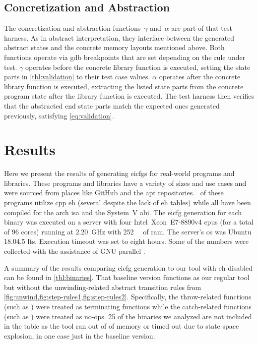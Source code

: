 \subsection{Concretization and Abstraction}
The concretization and abstraction functions~$\gamma$ and~$\alpha$ are part of that test harness.
As in abstract interpretation, they interface between the generated abstract states and the concrete memory layouts mentioned above.
Both functions operate via \gls{gdb} breakpoints that are set depending on the rule under test.
$\gamma$ operates before the concrete library function is executed, setting the state parts in \cref{tbl:validation} to their test case values.
$\alpha$ operates after the concrete library function is executed, extracting the listed state parts from the concrete program state after the library function is executed.
The test harness then verifies that the abstracted end state parts match the expected ones generated previously, satisfying \cref{eq:validation}.

\section{Results}\label{eicfg-results}
Here we present the results of generating \glspl{eicfg} for  real-world programs and libraries.
These programs and libraries have a variety of sizes and use cases and were sourced from places like GitHub and the \gls{apt} repositories.
\exceptbins\ of these programs utilize \gls{cpp} \gls{eh} (several despite the lack of \gls{eh} tables) while all have been compiled for the \gls{arch} \gls{isa} and the System~V \gls{abi}.
The \gls{eicfg} generation for each binary was executed on a server with four Intel\textregistered\ Xeon\textregistered\ E7-8890v4 \glspl{cpu} (for a total of 96 cores) running at \SI{2.20}{\giga\hertz} with \SI{252}{\gibi\byte} of \gls{ram}.
The server's \gls{os} was Ubuntu 18.04.5 \gls{lts}.
Execution timeout was set to eight hours. %
Some of the numbers were collected with the assistance of GNU parallel \autocite{Tange2011a}.

A summary of the results comparing \gls{eicfg} generation to our tool with \gls{eh} disabled can be found in \cref{tbl:binaries}.
That baseline version functions as our regular tool but without the unwinding-related abstract transition rules from \cref{fig:unwind,fig:step-rules1,fig:step-rules2}. Specifically, the throw-related functions (such as ) were treated as terminating functions while the catch-related functions (such as ) were treated as no-ops.
25 of the binaries we analyzed are not included in the table as the tool ran out of of memory or timed out due to state space explosion, in one case just in the baseline version.

